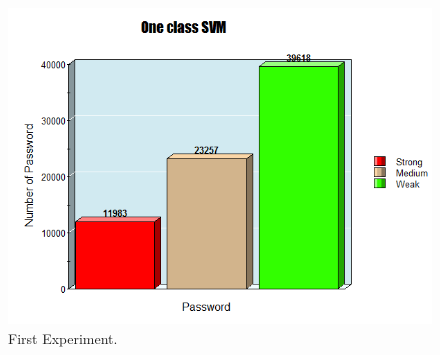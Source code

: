 \documentclass[runningheads]{llncs}
\begin{document}
{\begin{figure}
\begin{minipage}[b]{0.4\textwidth}
\begin{mdframed}
    \includegraphics[width=\textwidth]{First.png}
   \end{mdframed}
    \caption{First Experiment.}
  
  \end{minipage}
  

\end{figure}}
\end{document}
